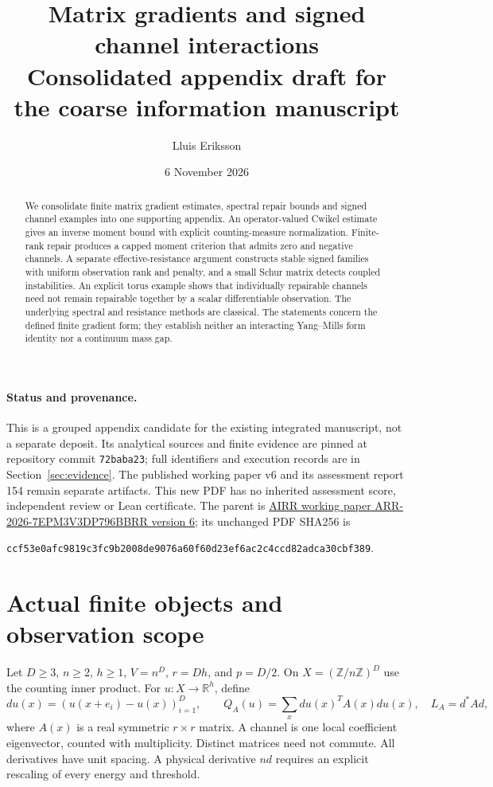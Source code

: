 \documentclass[11pt,a4paper]{article}
\title{Matrix gradients and signed channel interactions\\
\large Consolidated appendix draft for the coarse information manuscript}
\author{Lluis Eriksson}
\date{6 November 2026}
\newcommand{\R}{\mathbb R}
\begin{document}
\maketitle
\begin{abstract}
We consolidate finite matrix gradient estimates, spectral repair bounds and
signed channel examples into one supporting appendix. An operator-valued
Cwikel estimate gives an inverse moment bound with explicit counting-measure
normalization. Finite-rank repair produces a capped moment criterion that
admits zero and negative channels. A separate effective-resistance argument
constructs stable signed families with uniform observation rank and penalty,
and a small Schur matrix detects coupled instabilities. An explicit torus
example shows that individually repairable channels need not remain
repairable together by a scalar differentiable observation. The underlying
spectral and resistance methods are classical. The statements concern the
defined finite gradient form; they establish neither an interacting
Yang--Mills form identity nor a continuum mass gap.
\end{abstract}

\paragraph{Status and provenance.}
This is a grouped appendix candidate for the existing integrated manuscript,
not a separate deposit. Its analytical sources and finite evidence are pinned
at repository commit \texttt{72baba23}; full identifiers and execution records
are in Section~\ref{sec:evidence}. The published working paper v6 and its
assessment report 154 remain separate artifacts. This new PDF has no inherited
assessment score, independent review or Lean certificate.
The parent is
\href{https://airr.science/papers/ARR-2026-7EPM3V3DP796BBRR/versions/v6/}
{AIRR working paper ARR-2026-7EPM3V3DP796BBRR version 6}; its unchanged PDF
SHA256 is
\begin{center}\scriptsize
\texttt{ccf53e0afc9819c3fc9b2008de9076a60f60d23ef6ac2c4ccd82adca30cbf389}.
\end{center}

\section{Actual finite objects and observation scope}
Let $D\geq3$, $n\geq2$, $h\geq1$, $V=n^D$, $r=Dh$, and $p=D/2$.
On $X=(\mathbb Z/n\mathbb Z)^D$ use the counting inner product. For
$u:X\to\R^h$, define
\[
 du(x)=(u(x+e_i)-u(x))_{i=1}^D,\qquad
 Q_A(u)=\sum_x du(x)^T A(x)du(x),\quad L_A=d^*A d,
\]
where $A(x)$ is a real symmetric $r\times r$ matrix. A channel is one local
coefficient eigenvector, counted with multiplicity. Distinct matrices need
not commute. All derivatives have unit spacing. A physical derivative $nd$
requires an explicit rescaling of every energy and threshold.
\end{document}
